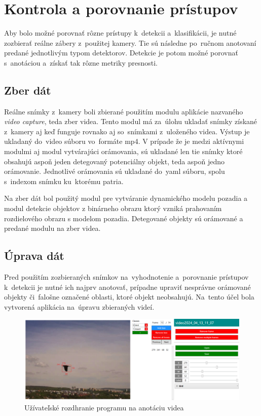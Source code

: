 \chapter{Kontrola a porovnanie prístupov}
    Aby bolo možné porovnať rôzne prístupy k~detekcii a~klasifikácii, je nutné zozbierať reálne zábery z~použitej kamery.  Tie sú následne po~ručnom anotovaní predané jednotlivým typom detektorov. Detekcie je potom možné porovnať s~anotáciou a~získať tak rôzne metriky presnosti.
    \section{Zber dát}
        Reálne snímky z~kamery boli zbierané použitím modulu aplikácie nazvaného \emph{video capture}, teda zber videa.  Tento modul má za~úlohu ukladať snímky získané z~kamery aj keď funguje rovnako aj so~snímkami z~uloženého videa.  Výstup je ukladaný do~video súboru vo~formáte mp4. V prípade že je medzi aktívnymi modulmi aj modul vytvárajúci orámovania, sú ukladané len tie snímky ktoré obsahujú aspoň jeden detegovaný potenciálny objekt, teda aspoň jedno orámovanie.  Jednotlivé orámovania sú ukladané do~yaml súboru, spolu s~indexom snímku ku~ktorému patria.

        Na zber dát bol použitý modul pre vytváranie dynamického modelu pozadia a modul detekcie objektov z binárneho obrazu ktorý vzniká prahovaním rozdielového obrazu s modelom pozadia. Detegované objekty sú orámované a predané modulu na zber videa.

    \section{Úprava dát}
        Pred použitím zozbieraných snímkov na~vyhodnotenie a~porovnanie prístupov k~detekcii je nutné ich najprv anotovať, prípadne upraviť nesprávne orámované objekty či~falošne označené oblasti, ktoré objekt neobsahujú. Na~tento účel bola vytvorená aplikácia na~úpravu zbieraných videí.

        \begin{figure}[H]
            \centering
            \includegraphics[width=\textwidth]{obrazky/video_annotator/annotation_overview.png}
            \caption{Užívateľské rozdhranie programu na anotáciu videa}
        \end{figure}

